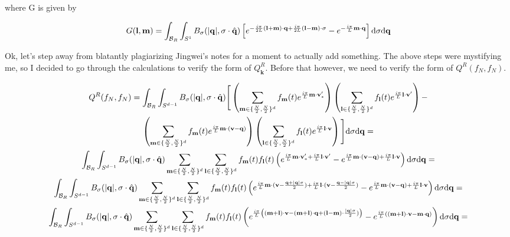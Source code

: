 \documentclass{article}
\def\t{\text}
\def\b{\mathbf}
\begin{document}
where G is given by

\begin{equation} \label{eq:Glm}
    G(\b l, \b m) = \int_{\mathcal{B}_R} \int_{S^{1}} B_{\sigma}(|\b q|, \sigma \cdot \hat{\b q}) \left[ e^{-\frac{i \pi}{2L} \b (\b l + \b m) \cdot \b q + \frac{i \pi}{2L} \b (\b l - \b m) \cdot \b \sigma} - e^{-\frac{i \pi}{L} \b m \cdot \b q } \right] \t d \sigma \t d \b q
\end{equation}

Ok, let's step away from blatantly plagiarizing Jingwei's notes for a moment to actually add something. The above steps were mystifying me, so I decided to go through the calculations to verify the form of $Q^R_{\b k}$. Before that however, we need to verify the form of $Q^R(f_N,f_N)$.

\begin{gather*}
    Q^R(f_N,f_N) = \int_{\mathcal{B}_R} \int_{S^{d-1}} B_{\sigma}(|\b q|, \sigma \cdot \hat{\b q}) \Bigg[ \left(\sum_{\b m \in \{\frac{N}{2}, \frac{N}{2} \}^d} f_{\b m}(t) e^{\frac{i \pi}{L} \b m \cdot \b v'_*} \right) \left(\sum_{\b l \in \{\frac{N}{2}, \frac{N}{2} \}^d} f_{\b l}(t) e^{\frac{i \pi}{L} \b l \cdot \b v'} \right) - \\
    \left(\sum_{\b m \in \{\frac{N}{2}, \frac{N}{2} \}^d} f_{\b m}(t) e^{\frac{i \pi}{L} \b m \cdot (\b v - \b q)} \right) \left(\sum_{\b l \in \{\frac{N}{2}, \frac{N}{2} \}^d} f_{\b l}(t) e^{\frac{i \pi}{L} \b l \cdot \b v} \right) \Bigg] \t d \sigma \t d \b q = \\
    \int_{\mathcal{B}_R} \int_{S^{d-1}} B_{\sigma}(|\b q|, \sigma \cdot \hat{\b q}) \sum_{\b m \in \{\frac{N}{2}, \frac{N}{2} \}^d} \sum_{\b l \in \{\frac{N}{2}, \frac{N}{2} \}^d} f_{\b m}(t) f_{\b l}(t) \left( e^{\frac{i \pi}{L} \b m \cdot \b v'_* + \frac{i \pi}{L} \b l \cdot \b v'}  - e^{\frac{i \pi}{L} \b m \cdot (\b v - \b q) + \frac{i \pi}{L} \b l \cdot \b v} \right) \t d \sigma \t d \b q = \\
    \int_{\mathcal{B}_R} \int_{S^{d-1}} B_{\sigma}(|\b q|, \sigma \cdot \hat{\b q}) \sum_{\b m \in \{\frac{N}{2}, \frac{N}{2} \}^d} \sum_{\b l \in \{\frac{N}{2}, \frac{N}{2} \}^d} f_{\b m}(t) f_{\b l}(t) \left( e^{\frac{i \pi}{L} \b m \cdot (\b v - \frac{\b q + |\b q| \sigma}{2}) + \frac{i \pi}{L} \b l \cdot \b (\b v - \frac{\b q - |\b q| \sigma}{2})}  - e^{\frac{i \pi}{L} \b m \cdot (\b v - \b q) + \frac{i \pi}{L} \b l \cdot \b v} \right) \t d \sigma \t d \b q = \\ 
    \int_{\mathcal{B}_R} \int_{S^{d-1}} B_{\sigma}(|\b q|, \sigma \cdot \hat{\b q}) \sum_{\b m \in \{\frac{N}{2}, \frac{N}{2} \}^d} \sum_{\b l \in \{\frac{N}{2}, \frac{N}{2} \}^d} f_{\b m}(t) f_{\b l}(t) \left( e^{\frac{i \pi}{L} \left( (\b m + \b l) \cdot \b v - (\b m + \b l) \cdot \b q + (\b l - \b m) \cdot \frac{|\b q| \sigma}{2} ) \right)}  - e^{\frac{i \pi}{L} \left( (\b m + \b l) \cdot \b v - \b m \cdot \b q \right)} \right) \t d \sigma \t d \b q = \\ 

\end{gather*}
\end{document}
